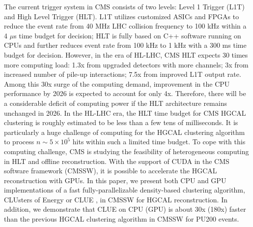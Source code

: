 The current trigger system in CMS consists of two levels: Level 1 Trigger (L1T) and High Level Trigger (HLT). L1T utilizes customized ASICs and FPGAs to reduce the event rate from 40 MHz LHC collision frequency to 100 kHz within a 4 $\mu$s time budget for decision; HLT is fully based on C++ software running on CPUs and further reduces event rate from 100 kHz to 1 kHz with a 300 ms time budget for decision. However, in the era of HL-LHC, CMS HLT expects 30 times more computing load: 1.3x from upgraded detectors with more channels; 3x from increased number of pile-up interactions; 7.5x from improved L1T output rate. Among this 30x surge of the computing demand, improvement in the CPU performance by 2026 is expected to account for only 4x. Therefore, there will be a considerable deficit of computing power if the HLT architecture remains unchanged in 2026. In the HL-LHC era, the HLT time budget for CMS HGCAL clustering is roughly estimated to be less than a few tens of milliseconds. It is particularly a huge challenge of computing for the HGCAL clustering algorithm to process $n\sim5\times10^5$ hits within such a limited time budget. To cope with this computing challenge, CMS is studying the feasibility of heterogeneous computing in HLT and offline reconstruction. With the support of CUDA \cite{nvidia2011nvidia} in the CMS software framework (CMSSW), it is possible to accelerate the HGCAL reconstruction with GPUs. In this paper, we present both CPU and GPU implementations of a fast fully-parallelizable density-based clustering algorithm, CLUsters of Energy or CLUE \cite{cluepaper}, in CMSSW for HGCAL reconstruction. In addition, we demonstrate that CLUE on CPU (GPU) is about 30x (180x) faster than the previous HGCAL clustering algorithm \cite{Chen:2017btc} in CMSSW for PU200 events. 
